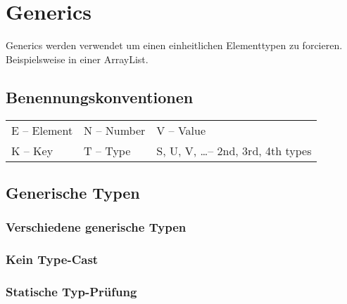 \section{Generics}
Generics werden verwendet um einen einheitlichen Elementtypen zu forcieren. Beispielsweise in einer ArrayList.
\subsection{Benennungskonventionen}
\begin{tabularx}{\columnwidth}{@{}l l l@{}}
    \tabitem{}E -- Element & \tabitem{}N -- Number & \tabitem{}V -- Value\\

    \tabitem{}K -- Key &\tabitem{}T -- Type &\tabitem{}S, U, V, \ldots -- 2nd, 3rd, 4th types
\end{tabularx}

\subsection{Generische Typen}
\vspace{-0.8\abovedisplayskip}
\begin{minipage}[t]{0.6\columnwidth}
    \subsubsection{Verschiedene generische Typen}
    
    \subsubsection{Kein Type-Cast}
    
\end{minipage}\hfill%
\begin{minipage}[t]{0.4\columnwidth}
    \subsubsection{Statische Typ-Prüfung}
    
\end{minipage}



